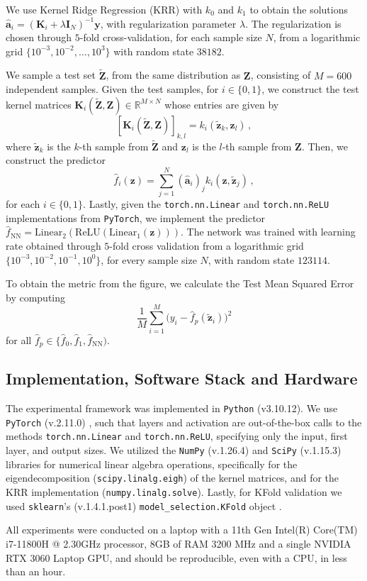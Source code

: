 We use Kernel Ridge Regression (KRR) with $k_0$ and $k_1$ to obtain the solutions $\hat{\bm a}_i = (\bm K_i + \lambda \bm I_N)^{-1} \bm y$, with regularization parameter $\lambda$. The regularization is chosen through $5$-fold cross-validation, for each sample size $N$, from a logarithmic grid $\{10^{-3}, 10^{-2}, \dots, 10^3\}$  with random state $38182$.

We sample a test set $\tilde{\bm Z}$, from the same distribution as $\bm Z$, consisting of $M = 600$ independent samples. Given the test samples, for $i \in \{0, 1\}$, we construct the test kernel matrices $\bm K_i(\tilde{\bm Z}, \bm Z) \in \mathbb R^{M\times N}$ whose entries are given by
\[ 
    [\bm K_i(\tilde{\bm Z}, \bm Z)]_{k,l} = k_i(\tilde{\bm z}_k, \bm z_l)\, ,
\]
where $\tilde{\bm z}_k$ is the $k$-th sample from $\tilde{\bm Z}$ and $\bm z_l$ is the $l$-th sample from $\bm Z$. Then, we construct the predictor
\[
    \hat{f}_i(\bm z) = \sum_{j=1}^N (\hat{\bm a}_i)_j k_i(\bm z, \tilde{\bm z}_j)\, ,
\]
for each $i \in \{0, 1\}$. Lastly, given the \texttt{torch.nn.Linear} and \texttt{torch.nn.ReLU} implementations from \texttt{PyTorch}, we implement the predictor $\hat{f}_{\text{NN}} =  \text{Linear}_{2}(\text{ReLU}(\text{Linear}_{1}(\boldsymbol{z})))$. The network was trained with learning rate obtained through $5$-fold cross validation from a logarithmic grid $\{10^{-3}, 10^{-2}, 10^{-1}, 10^0\}$, for every sample size $N$, with random state $123114$.

To obtain the metric from the figure, we calculate the Test Mean Squared Error by computing
\[
  \frac{1}{M} \sum_{i=1}^{M} \Big(y_i - \hat{f}_{p}(\tilde{\bm z}_i)\Big)^2
\]
for all $\hat{f}_{p} \in \{\hat{f}_{0}, \hat{f}_{1}, \hat{f}_{\text{NN}})$.

\subsection{Implementation, Software Stack and Hardware}
The experimental framework was implemented in \texttt{Python} (v3.10.12). We use \texttt{PyTorch} (v.2.11.0) \citep{Adam2019Pytorch}, such that layers and activation are out-of-the-box calls to the methods \texttt{torch.nn.Linear} and \texttt{torch.nn.ReLU}, specifying only the input, first layer, and output sizes. We utilized the \texttt{NumPy} (v.1.26.4) \citep{Harris2020numpy} and \texttt{SciPy} (v.1.15.3) \citep{2020SciPy} libraries for numerical linear algebra operations, specifically for the eigendecomposition (\texttt{scipy.linalg.eigh}) of the kernel matrices, and for the KRR implementation (\texttt{numpy.linalg.solve}). Lastly, for KFold validation we used \texttt{sklearn}'s (v.1.4.1.post1) \texttt{model\_selection.KFold} object \citep{2011Sklearn}.

All experiments were conducted on a laptop with a 11th Gen Intel(R) Core(TM) i7-11800H @ 2.30GHz processor, 8GB of RAM 3200 MHz and a single NVIDIA RTX 3060 Laptop GPU, and should be reproducible, even with a CPU, in less than an hour.
